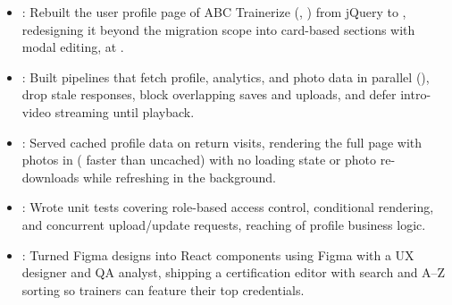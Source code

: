\begin{itemize}
  \item {}: Rebuilt the user profile page of ABC Trainerize (, ) from jQuery to , redesigning it beyond the migration scope into card-based sections with modal editing, at .
  \item {}: Built  pipelines that fetch profile, analytics, and photo data in parallel (), drop stale responses, block overlapping saves and uploads, and defer intro-video streaming until playback.
  \item {}: Served cached profile data on return visits, rendering the full page with photos in  (\resumeEmphasis{2.4\ensuremath{\times}} faster than uncached) with no loading state or photo re-downloads while refreshing in the background.
  \item {}: Wrote  unit tests covering role-based access control, conditional rendering, and concurrent upload/update requests, reaching  of profile business logic.
  \item {}: Turned Figma designs into React components using Figma  with a UX designer and QA analyst, shipping a  certification editor with search and A--Z sorting so trainers can feature their top credentials.
\end{itemize}
